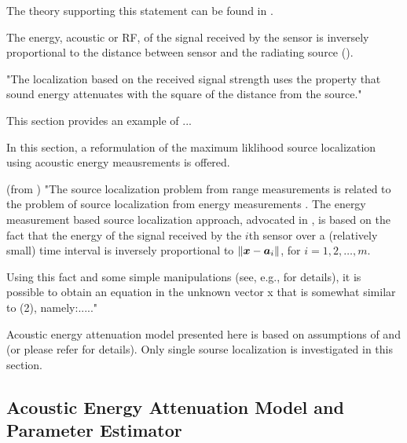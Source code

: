 The theory supporting this statement can be found in \cite{LiHu,ShengHu,Saric,Cheung,CheungSo}.


The energy, acoustic or RF, of the signal received by the sensor is inversely proportional to the distance between sensor and the radiating source (\cite{LiHu,ShengHu,Saric,Cheung,CheungSo}).

"The localization based on the received signal strength uses the property that sound energy attenuates with the square of the distance from the source."

This section provides an example of ...

In this section, a reformulation of the maximum liklihood source localization using acoustic energy meausrements is offered.

(from \cite{StLi}) "The source localization problem from range measurements is related to the problem of source localization from energy measurements \cite{LiHu,ShengHu,Saric,Cheung,CheungSo}.
The energy measurement based source localization approach, advocated in \cite{LiHu}, \cite{Saric} is based on the fact that the energy of the signal received by the $i$th sensor over a (relatively small) time interval is inversely proportional to $\| \mbox{\boldmath$x$} - \mbox{\boldmath$a$}_i \|$, for $i = 1, 2, \ldots,m$. 

Using this fact and some simple manipulations (see, e.g., \cite{LiHu} for details), it is possible to obtain an
equation in the unknown vector x that is somewhat similar to (2), namely:....."

Acoustic energy attenuation model presented here is based on assumptions of \cite{LiHu} and \cite{Saric} (or please refer for details). Only single sourse localization is investigated in this section.


\subsection{Acoustic Energy Attenuation Model and Parameter Estimator}


